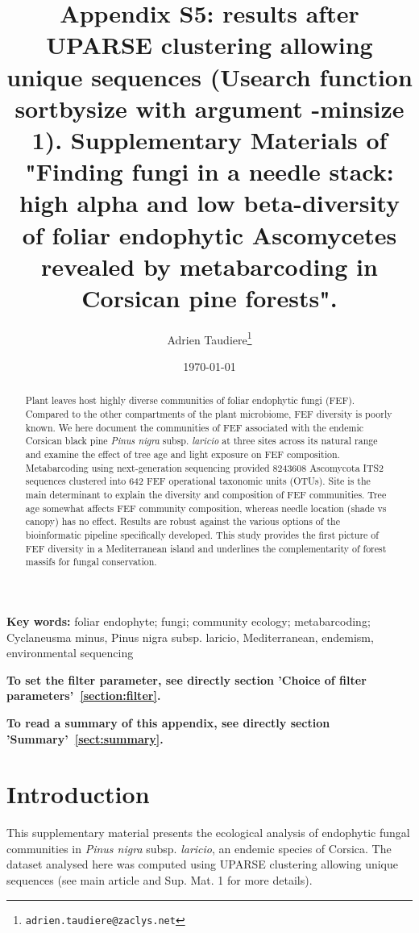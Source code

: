 \documentclass[12pt]{article}\usepackage[]{graphicx}\usepackage[]{color}
\title{Appendix S5: results after UPARSE clustering allowing unique sequences (Usearch function sortbysize with argument -minsize 1). Supplementary Materials of "Finding fungi in a needle stack: high alpha and low beta-diversity of foliar endophytic Ascomycetes revealed by metabarcoding in Corsican pine forests".}
\author{Adrien Taudiere\thanks{\texttt{adrien.taudiere@zaclys.net}}}
\affil{{\footnotesize CEFE - Centre d'Ecologie Fonctionnelle et Evolutive, Montpellier: France}}
\date{\today}
\numberwithin{figure}{section}
\begin{document}






\maketitle

\begin{abstract}

Plant leaves host highly diverse communities of foliar endophytic fungi (FEF). Compared to the other compartments of the plant microbiome, FEF diversity is poorly known. We here document the communities of FEF associated with the endemic Corsican black pine \textit{Pinus nigra} subsp. \textit{laricio} at three sites across its natural range and examine the effect of tree age and light exposure on FEF composition. Metabarcoding using next-generation sequencing provided 8243608 Ascomycota ITS2 sequences clustered into 642 FEF operational taxonomic units (OTUs). Site is the main determinant to explain the diversity and composition of FEF communities. Tree age somewhat affects FEF community composition, whereas needle location (shade vs canopy) has no effect. Results are robust against the various options of the bioinformatic pipeline specifically developed. This study provides the first picture of FEF diversity in a Mediterranean island and underlines the complementarity of forest massifs for fungal conservation.

\end{abstract}


\textbf{Key words:} foliar endophyte; fungi; community ecology; metabarcoding; Cyclaneusma minus, Pinus nigra subsp. laricio, Mediterranean, endemism, environmental sequencing


\vfill
\begin{center}
\textbf{To set the filter parameter, see directly section 'Choice of filter parameters'~\ref{section:filter}.}

\textbf{To read a summary of this appendix, see directly section 'Summary'~\ref{sect:summary}.}
\end{center}

\newpage
\tableofcontents
\newpage


\section{Introduction}

This supplementary material presents the ecological analysis of endophytic fungal communities in \textit{Pinus nigra} subsp. \textit{laricio}, an endemic species of Corsica. The dataset analysed here was computed using UPARSE clustering allowing unique sequences (see main article and Sup. Mat. 1 for more details).
\end{document}
